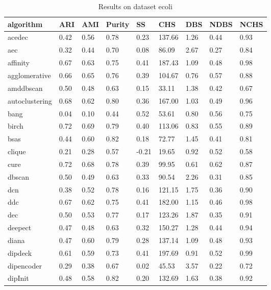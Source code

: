 \begin{table}[H]
\centering
\caption{Results on dataset ecoli}
\label{S61_Table}
\begin{tabular}{|l|l|l|l|l|l|l|l|l|}
\hline
algorithm & ARI & AMI & Purity & SS & CHS & DBS & NDBS & NCHS \\
\hline
acedec & 0.42 & 0.56 & 0.78 & 0.23 & 137.66 & 1.26 & 0.44 & 0.93 \\
\hline
aec & 0.32 & 0.44 & 0.70 & 0.08 & 86.09 & 2.67 & 0.27 & 0.84 \\
\hline
affinity & 0.67 & 0.63 & 0.75 & 0.41 & 187.43 & 1.09 & 0.48 & 0.98 \\
\hline
agglomerative & 0.66 & 0.65 & 0.76 & 0.39 & 104.67 & 0.76 & 0.57 & 0.88 \\
\hline
amddbscan & 0.50 & 0.48 & 0.63 & 0.15 & 33.11 & 1.38 & 0.42 & 0.67 \\
\hline
autoclustering & 0.68 & 0.62 & 0.80 & 0.36 & 167.00 & 1.03 & 0.49 & 0.96 \\
\hline
bang & 0.04 & 0.10 & 0.44 & 0.52 & 53.61 & 0.80 & 0.56 & 0.75 \\
\hline
birch & 0.72 & 0.69 & 0.79 & 0.40 & 113.06 & 0.83 & 0.55 & 0.89 \\
\hline
bsas & 0.44 & 0.60 & 0.82 & 0.18 & 72.77 & 1.45 & 0.41 & 0.81 \\
\hline
clique & 0.21 & 0.28 & 0.57 & -0.21 & 19.65 & 0.92 & 0.52 & 0.58 \\
\hline
cure & 0.72 & 0.68 & 0.78 & 0.39 & 99.95 & 0.61 & 0.62 & 0.87 \\
\hline
dbscan & 0.50 & 0.49 & 0.63 & 0.33 & 90.54 & 2.26 & 0.31 & 0.85 \\
\hline
dcn & 0.38 & 0.52 & 0.78 & 0.16 & 121.15 & 1.75 & 0.36 & 0.90 \\
\hline
ddc & 0.67 & 0.62 & 0.75 & 0.41 & 182.00 & 1.15 & 0.46 & 0.98 \\
\hline
dec & 0.50 & 0.53 & 0.77 & 0.17 & 123.26 & 1.87 & 0.35 & 0.91 \\
\hline
deepect & 0.47 & 0.48 & 0.63 & 0.32 & 150.27 & 1.28 & 0.44 & 0.94 \\
\hline
diana & 0.47 & 0.60 & 0.79 & 0.28 & 137.14 & 1.09 & 0.48 & 0.93 \\
\hline
dipdeck & 0.61 & 0.59 & 0.73 & 0.41 & 197.69 & 0.91 & 0.52 & 0.99 \\
\hline
dipencoder & 0.29 & 0.38 & 0.67 & 0.02 & 45.53 & 3.57 & 0.22 & 0.72 \\
\hline
dipInit & 0.48 & 0.58 & 0.82 & 0.20 & 132.69 & 1.63 & 0.38 & 0.92 \\

\end{tabular}
\end{table}
